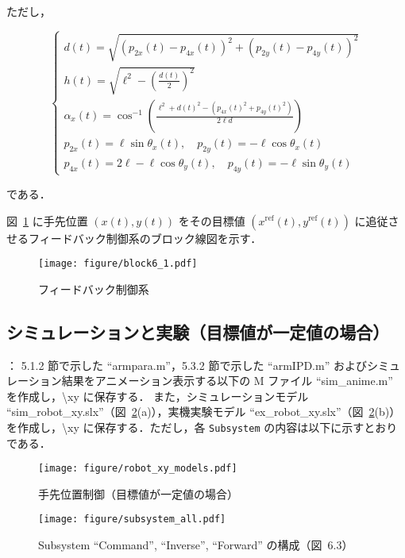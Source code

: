 ただし，

\begin{equation}
\begin{cases}
d(t) = \sqrt{(p_{2x}(t) - p_{4x}(t))^2 + (p_{2y}(t) - p_{4y}(t))^2} \\
h(t) = \sqrt{\ell^2 - \left( \frac{d(t)}{2} \right)^2} \\
\alpha_x(t) = \cos^{-1} \left( \frac{\ell^2 + d(t)^2 - (p_{4x}(t)^2 + p_{4y}(t)^2)}{2\ell d} \right) \\
p_{2x}(t) = \ell \sin \theta_x(t),\quad p_{2y}(t) = -\ell \cos \theta_x(t) \\
p_{4x}(t) = 2\ell - \ell \cos \theta_y(t),\quad p_{4y}(t) = -\ell \sin \theta_y(t)
\end{cases}
\end{equation}

である．

図~\ref{fig:block_diagram} に手先位置 $(x(t), y(t))$ をその目標値 $(x^{\mathrm{ref}}(t), y^{\mathrm{ref}}(t))$ に追従させるフィードバック制御系のブロック線図を示す．

\begin{figure}[H]
  \centering
  \texttt{[image: figure/block6\_1.pdf]}
  \caption{フィードバック制御系}
  \label{fig:block_diagram}
\end{figure}

\subsection{シミュレーションと実験（目標値が一定値の場合）}

：
5.1.2 節で示した ``armpara.m''，5.3.2 節で示した ``armIPD.m'' およびシミュレーション結果をアニメーション表示する以下の M ファイル ``sim\_anime.m'' を作成し，\textbackslash xy に保存する．
また，シミュレーションモデル ``sim\_robot\_xy.slx''（図~\ref{fig:sim_robot_xy}(a)），実機実験モデル ``ex\_robot\_xy.slx''（図~\ref{fig:sim_robot_xy}(b)）を作成し，\textbackslash xy に保存する．ただし，各 \texttt{Subsystem} の内容は以下に示すとおりである．

\begin{figure}[H]
    \centering
    \texttt{[image: figure/robot\_xy\_models.pdf]}
    \caption{手先位置制御（目標値が一定値の場合）}
    \label{fig:sim_robot_xy}
\end{figure}

\begin{figure}[H]
    \centering
    \texttt{[image: figure/subsystem\_all.pdf]}
    \caption{Subsystem ``Command'', ``Inverse'', ``Forward'' の構成（図~6.3）}
    \label{fig:subsystems}
\end{figure}

